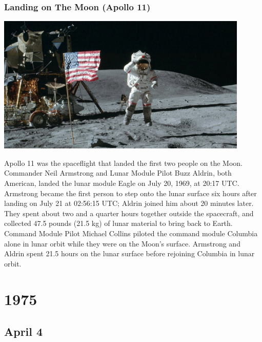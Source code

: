 \documentclass[11pt]{report}
\begin{document}
\subsection{Landing on The Moon (Apollo 11)}
\vspace{2mm}\begin{center}\includegraphics[width=12cm]{./img/apollo11.jpg}\end{center}
Apollo 11 was the spaceflight that landed the first two people on the Moon. Commander Neil Armstrong and Lunar Module Pilot Buzz Aldrin, both American, landed the lunar module Eagle on July 20, 1969, at 20:17 UTC. Armstrong became the first person to step onto the lunar surface six hours after landing on July 21 at 02:56:15 UTC; Aldrin joined him about 20 minutes later. They spent about two and a quarter hours together outside the spacecraft, and collected 47.5 pounds (21.5 kg) of lunar material to bring back to Earth. Command Module Pilot Michael Collins piloted the command module Columbia alone in lunar orbit while they were on the Moon's surface. Armstrong and Aldrin spent 21.5 hours on the lunar surface before rejoining Columbia in lunar orbit.

\chapter{1975}
\section{April 4}
\end{document}
